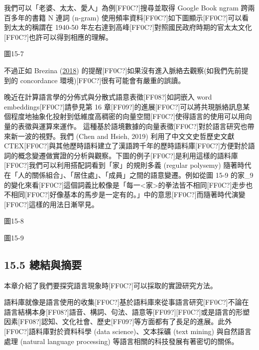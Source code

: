 我們可以「老婆、太太、愛人」為例[FF0C?]搜尋並取得 Google Book ngram 跨兩百多年的書籍 N 連詞 (n-gram) 使用頻率資料[FF0C?]如下圖顯示[FF0C?]可以看到太太的稱謂在 1940-50 年左右達到高峰[FF0C?]對照國民政府時期的官太太文化[FF0C?]也許可以得到相應的理解。  
 

圖15-7

不過正如 Brezina (\hyperlink{bookmarkid41mghml}{2018}) 的提醒[FF0C?]如果沒有進入脈絡去觀察(如我們先前提到的 concordance 環境)[FF0C?]很有可能會有嚴重的誤讀。

晚近在計算語言學的分佈式與分散式語意表徵[FF08?]如詞嵌入 word embeddings[FF0C?]請參見第 16 章[FF09?]的進展[FF0C?]可以將共現脈絡訊息某個程度地抽象化投射到低維度高稠密的向量空間[FF0C?]使得語言的使用可以用向量的表徵與運算來運作。 這種基於語境數據的向量表徵[FF0C?]對於語言研究也帶來新一波的視野。我們 (Chen and Hsieh, 2019) 利用了中文文史哲歷史文獻 CTEX[FF0C?]與其他歷時語料建立了漢語跨千年的歷時語料庫[FF0C?]方便對於語詞的概念變遷做實證的分析與觀察。下圖的例子[FF0C?]是利用這樣的語料庫[FF0C?]我們可以利用搭配詞看到「家」的規則多義 (regular polysemy) 隨著時代在「人的關係組合」、「居住處」、「成員」之間的語意變遷。例如從圖 15-9 的家\_9的變化來看[FF0C?]這個詞義比較像是「每一<家>的拳法皆不相同[FF0C?]走步也不相同[FF0C?]好像基本的馬步是一定有的。」中的意思[FF0C?]而隨著時代演變[FF0C?]這樣的用法日漸罕見。  
 

圖15-8

  
 

圖15-9

\subsection{15.5 總結與摘要}

本章介紹了我們要探究語言現象時[FF0C?]可以採取的實證研究方法。

語料庫就像是語言使用的收集[FF0C?]基於語料庫來從事語言研究[FF0C?]不論在語言結構本身[FF08?]語音、構詞、句法、語意等[FF09?][FF0C?]或是語言的形塑因素[FF08?]認知、文化社會、歷史[FF09?]等方面都有了長足的進展。此外[FF0C?]語料庫對於資料科學 (data science)、文本採礦 (text mining) 與自然語言處理 (natural language processing) 等語言相關的科技發展有著密切的關係。

